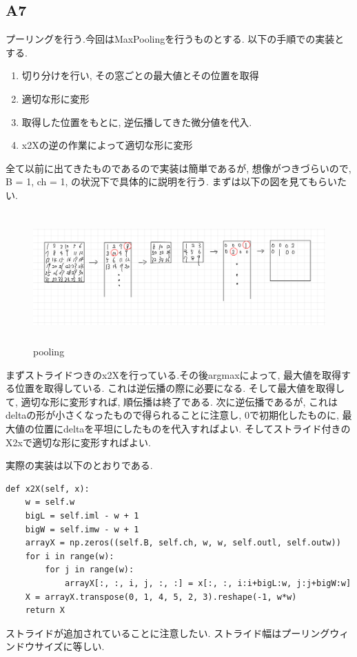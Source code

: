 \documentclass[a4paper,11pt]{jsarticle}
\begin{document}
\subsection{A7}
プーリングを行う.今回はMaxPoolingを行うものとする.
以下の手順での実装とする.
\begin{enumerate}
  \item 切り分けを行い, その窓ごとの最大値とその位置を取得
  \item 適切な形に変形
  \item 取得した位置をもとに, 逆伝播してきた微分値を代入.
  \item x2Xの逆の作業によって適切な形に変形
\end{enumerate}

全て以前に出てきたものであるので実装は簡単であるが,
想像がつきづらいので, B = 1, ch = 1, の状況下で具体的に説明を行う.
まずは以下の図を見てもらいたい.

\begin{figure}[h]
  \centering
  \includegraphics[height = 5cm]{pooling.jpg}
  \caption{pooling}
\end{figure}
まずストライドつきのx2Xを行っている.その後argmaxによって, 最大値を取得する位置を取得している.
これは逆伝播の際に必要になる. そして最大値を取得して, 適切な形に変形すれば, 順伝播は終了である.
次に逆伝播であるが, これはdeltaの形が小さくなったもので得られることに注意し, 0で初期化したものに,
最大値の位置にdeltaを平坦にしたものを代入すればよい. そしてストライド付きのX2xで適切な形に変形すればよい.

実際の実装は以下のとおりである.
\begin{lstlisting}[caption=pooling\_x2X]
  def x2X(self, x):
    w = self.w
    bigL = self.iml - w + 1
    bigW = self.imw - w + 1
    arrayX = np.zeros((self.B, self.ch, w, w, self.outl, self.outw))
    for i in range(w):
        for j in range(w):
            arrayX[:, :, i, j, :, :] = x[:, :, i:i+bigL:w, j:j+bigW:w]
    X = arrayX.transpose(0, 1, 4, 5, 2, 3).reshape(-1, w*w)
    return X
\end{lstlisting}
ストライドが追加されていることに注意したい. ストライド幅はプーリングウィンドウサイズに等しい.
\end{document}

